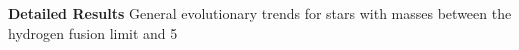 \textbf{Detailed Results}
General evolutionary trends for stars with masses between the hydrogen fusion limit and 5